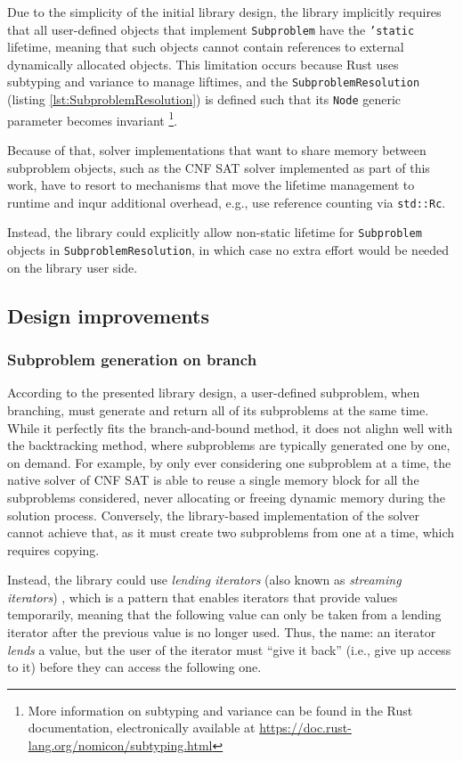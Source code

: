Due to the simplicity of the initial library design, the library implicitly requires
that all user-defined objects that implement \texttt{Subproblem} have the \texttt{'static}
lifetime, meaning that such objects cannot contain references to external
dynamically allocated objects. This limitation occurs because Rust uses subtyping and
variance to manage liftimes, and the \texttt{SubproblemResolution}
(listing \ref{lst:SubproblemResolution}) is defined
such that its \texttt{Node} generic parameter becomes invariant
\footnote{More information on subtyping and variance can be found in the Rust documentation,
electronically available at \url{https://doc.rust-lang.org/nomicon/subtyping.html}}.

Because of that, solver implementations that want to share memory between subproblem objects,
such as the CNF SAT solver implemented as part of this work, have to resort to mechanisms
that move the lifetime management to runtime and inqur additional overhead, e.g.,
use reference counting via \texttt{std::Rc}.

Instead, the library could explicitly allow non-static lifetime for \texttt{Subproblem}
objects in \texttt{SubproblemResolution}, in which case no extra effort would be needed
on the library user side.

\subsection{Design improvements}

\subsubsection{Subproblem generation on branch}

According to the presented library design, a user-defined subproblem, when branching,
must generate and return all of its subproblems at the same time. While it perfectly fits
the branch-and-bound method, it does not alighn well with the backtracking method, where
subproblems are typically generated one by one, on demand. For example, by only ever
considering one subproblem at a time, the native solver of CNF SAT is able to reuse
a single memory block for all the subproblems considered, never allocating or freeing
dynamic memory during the solution process. Conversely, the library-based implementation
of the solver cannot achieve that, as it must create two subproblems from one
at a time, which requires copying.

Instead, the library could use \emph{lending iterators}
(also known as \emph{streaming iterators}) \cite{LendingIterator},
which is a pattern that enables iterators that provide values temporarily,
meaning that the following value can only be taken from a lending iterator after the previous
value is no longer used. Thus, the name: an iterator \emph{lends} a value,
but the user of the iterator must ``give it back'' (i.e., give up access to it)
before they can access the following one.

